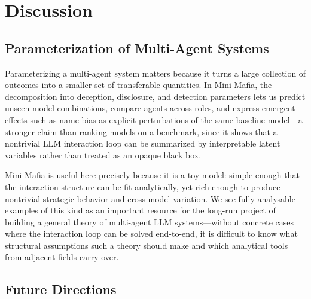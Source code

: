 \documentclass[sigconf,anonymous,balance=false]{aamas}
\begin{document}
\section{Discussion}
\label{sec:discussion}

\subsection{Parameterization of Multi-Agent Systems}

Parameterizing a multi-agent system matters because it turns a large collection of outcomes into a smaller set of transferable quantities. In Mini-Mafia, the decomposition into deception, disclosure, and detection parameters lets us predict unseen model combinations, compare agents across roles, and express emergent effects such as name bias as explicit perturbations of the same baseline model---a stronger claim than ranking models on a benchmark, since it shows that a nontrivial LLM interaction loop can be summarized by interpretable latent variables rather than treated as an opaque black box.

Mini-Mafia is useful here precisely because it is a toy model: simple enough that the interaction structure can be fit analytically, yet rich enough to produce nontrivial strategic behavior and cross-model variation. We see fully analysable examples of this kind as an important resource for the long-run project of building a general theory of multi-agent LLM systems---without concrete cases where the interaction loop can be solved end-to-end, it is difficult to know what structural assumptions such a theory should make and which analytical tools from adjacent fields carry over.

\subsection{Future Directions}
\end{document}
